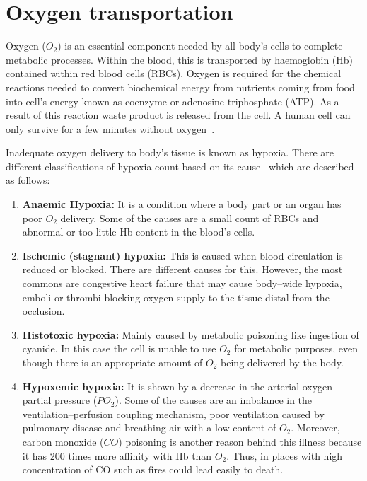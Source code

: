 \section{Oxygen transportation}
\label{section literature 1.2}
Oxygen ($O_2$) is an essential component needed by all body's cells to complete metabolic processes. Within the blood, this is transported by haemoglobin (Hb) contained within red blood cells (RBCs). Oxygen is required for the chemical reactions needed to convert biochemical energy from nutrients coming from food into cell's energy known as coenzyme or adenosine triphosphate (ATP). As a result of this reaction waste product is released from the cell. A human cell can only survive for a few minutes without oxygen~\cite{culmsee2005apoptosis}.

Inadequate oxygen delivery to body's tissue is known as hypoxia. There are different classifications of hypoxia count based on its cause~\cite{marieb2007human} which are described as follows: 

\begin{enumerate}
    \item \textbf{Anaemic Hypoxia:} It is a condition where a body part or an organ has poor $O_2$ delivery. Some of the causes are a small count of RBCs and abnormal or too little Hb content in the blood's cells.
    \item \textbf{Ischemic (stagnant) hypoxia: }This is caused when blood circulation is reduced or blocked. There are different causes for this. However, the most commons are congestive heart failure that may cause body–wide hypoxia, emboli or thrombi blocking oxygen supply to the tissue distal from the occlusion. 
    \item \textbf{Histotoxic hypoxia: }Mainly caused by metabolic poisoning like ingestion of cyanide. In this case the cell is unable to use $O_2$ for metabolic purposes, even though there is an appropriate amount of $O_2$ being delivered by the body.
    \item \textbf{Hypoxemic hypoxia:} It is shown by a decrease in the arterial oxygen partial pressure ($PO_2$). Some of the causes are an imbalance in the ventilation–perfusion coupling mechanism, poor ventilation caused by pulmonary disease and breathing air with a low content of $O_2$. Moreover, carbon monoxide ($CO$) poisoning is another reason behind this illness because it has \num{200} times more affinity with Hb than $O_2$. Thus, in places with high concentration of CO such as fires could lead easily to death.
\end{enumerate}




